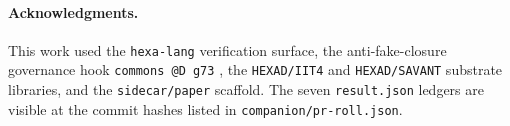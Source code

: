 \documentclass[11pt,a4paper]{article}
\begin{document}
\paragraph{Acknowledgments.}
This work used the \texttt{hexa-lang} verification surface, the
anti-fake-closure governance hook \texttt{commons @D g73}
\citep{anima_g73}, the \texttt{HEXAD/IIT4} and \texttt{HEXAD/SAVANT}
substrate libraries, and the \texttt{sidecar/paper} scaffold. The seven
\texttt{result.json} ledgers are visible at the commit hashes listed in
\texttt{companion/pr-roll.json}.



\end{document}
